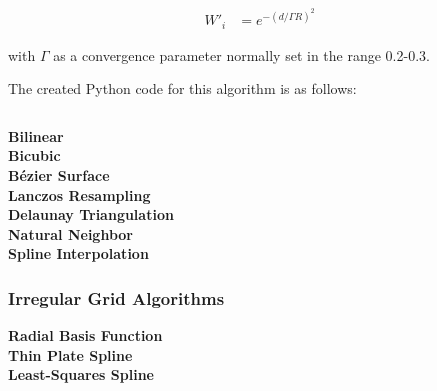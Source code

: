             \begin{align*}
                W'_{i} &= e^{-(d/\Gamma R)^{2}}
            \end{align*}

            with $\Gamma$ as a convergence parameter normally set in the range 0.2-0.3.

            The created Python code for this algorithm is as follows:

            \inputminted[mathescape,linenos,numbersep=5pt,frame=lines,framesep=2mm]{python}{./code/barnes.py}

        \textbf{Bilinear}\label{datavalidation_bilinear} \\


        
        \textbf{Bicubic}\label{datavalidation_bicubic} \\
        
        \textbf{B\'{e}zier Surface}\label{datavalidation_beziersurface} \\
        
        \textbf{Lanczos Resampling}\label{datavalidation_lanczosresampling} \\
        
        \textbf{Delaunay Triangulation}\label{datavalidation_delaunaytriangulation} \\
        
        \textbf{Natural Neighbor}\label{datavalidation_naturalneighbour} \\
        
        \textbf{Spline Interpolation}\label{datavalidation_splineinterpolation} \\

    \subsubsection{Irregular Grid Algorithms}\label{datavalidation_irregular_grid}

        \textbf{Radial Basis Function}\label{datavalidation_radial_basis_function} \\

        \textbf{Thin Plate Spline}\label{datavalidation_thin_plate_spline} \\

        \textbf{Least-Squares Spline}\label{datavalidation_least_squares_spline} \\

